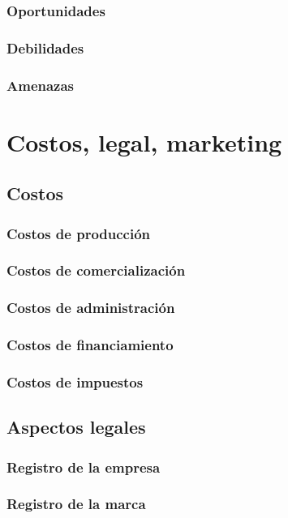 \subsubsection{Oportunidades}
\subsubsection{Debilidades}
\subsubsection{Amenazas}


\section{Costos, legal, marketing}
\subsection{Costos}
\subsubsection{Costos de producción} \label{SeccionCostosProduccion}
\subsubsection{Costos de comercialización}
\subsubsection{Costos de administración}
\subsubsection{Costos de financiamiento}
\subsubsection{Costos de impuestos}

\subsection{Aspectos legales}
\subsubsection{Registro de la empresa}
\subsubsection{Registro de la marca}

